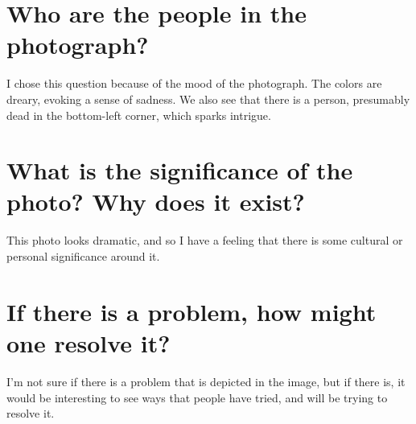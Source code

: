 \documentclass[../../main.tex]{subfiles}
\begin{document}
\section{Who are the people in the photograph?}
I chose this question because of the mood of the photograph. The colors are dreary, evoking a sense of sadness. We also see that there is a person, presumably dead in the bottom-left corner, which sparks intrigue.

\section{What is the significance of the photo? Why does it exist?}
This photo looks dramatic, and so I have a feeling that there is some cultural or personal significance around it.

\section{If there is a problem, how might one resolve it?}
I'm not sure if there is a problem that is depicted in the image, but if there is, it would be interesting to see ways that people have tried, and will be trying to resolve it.
\end{document}

